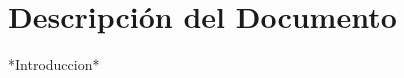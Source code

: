 
\tableofcontents


\listoffigures
\listoftables



\section{Descripción del Documento}

*Introduccion*